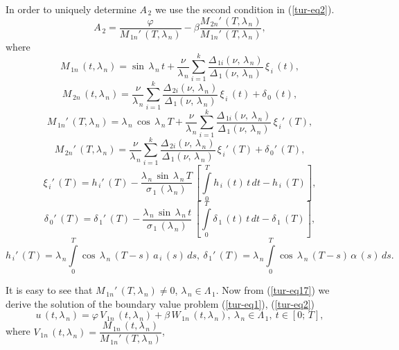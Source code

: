 ﻿\documentclass[
11pt,%
tightenlines,%
twoside,%
onecolumn,%
nofloats,%
nobibnotes,%
nofootinbib,%
superscriptaddress,%
noshowpacs,%
centertags]%
{revtex4}
\begin{document}
In order to uniquely determine $A_{\, 2}$ we use the second condition in (\ref{tur-eq2}). 
\[
A_{\, 2}=\dfrac{\varphi}{M_{\, 1 n}' \, (T , \lambda_{\, n})}-\beta \dfrac{M_{\, 2 n}' \, (T , \lambda_{\, n})}{M_{\, 1 n}' \, (T , \lambda_{\, n})} ,
\]
where
\[
M_{\, 1 n} \, (t , \lambda_{\, n})=\sin \, \lambda_{\, n} \, t+\frac{\nu}{\lambda_{\, n}} \sum \limits_{i=1}^{k}  \frac{\Delta_{\, 1 i }(\nu , \, \lambda_{\, n})}{\Delta_{\, 1} (\nu , \, \lambda_{\, n})} \, \xi_{\, i} \, (t) ,
\]
\[
M_{\, 2 n} \, (t , \lambda_{\, n})=\frac{\nu}{\lambda_{\, n}} \sum \limits_{i=1}^{k}  \frac{\Delta_{\, 2 i }(\nu , \, \lambda_{\, n})}{\Delta_{\, 1} (\nu , \, \lambda_{\, n})} \, \xi_{\, i} \, (t)+\delta_{\, 0} \, (t) ,
\]
\[
M_{\, 1 n}' \, (T , \lambda_{\, n})=\lambda_{\, n} \, \cos \, \lambda_{\, n} \, T+\frac{\nu}{\lambda_{\, n}} \sum \limits_{i=1}^{k}  \frac{\Delta_{\, 1 i }(\nu , \, \lambda_{\, n})}{\Delta_{\, 1} (\nu , \, \lambda_{\, n})} \, \xi_{\, i}' \, (T) ,
\]
\[
M_{\, 2 n}' \, (T , \lambda_{\, n})=\frac{\nu}{\lambda_{\, n}} \sum \limits_{i=1}^{k}  \frac{\Delta_{\, 2 i }(\nu , \, \lambda_{\, n})}{\Delta_{\, 1} (\nu , \, \lambda_{\, n})} \, \xi_{\, i}' \, (T)+\delta_{\, 0}' \, (T) ,
\]
\[
\xi_{\, i}' \, (T)=h_{\, i}' \, (T)-\frac{\lambda_{\, n} \, \sin \, \lambda_{\, n} \, T}{\sigma_{\, 1} \, (\lambda_{\, n})} \, \left[ \int \limits_{0}^T h_{\, i} \, (t) \, t \, d t-h_{\, i} \, (T) \right] ,
\]
\[
\delta_{\, 0}' \, (T)=\delta_{\, 1}' \, (T)-\frac{\lambda_{\, n} \, \sin \, \lambda_{\, n} \, t}{\sigma_{\, 1} \, (\lambda_{\, n})} \, \left[ \int \limits_{0}^T \delta_{\, 1} \, (t) \, t \, d t-\delta_{\, 1} \, (T) \right] ,
\]
\[
h_{\, i}' \, (T)= \lambda_{\, n} \int \limits_{0}^T \cos  \, \lambda_{\, n} \, (T-s) \, a_{\, i} \, (s) \, d s , \: 
 \delta_{\, 1}' \, (T)=\lambda_{\, n} \int \limits_{0}^T \cos  \, \lambda_{\, n} \, (T-s) \, \alpha \, (s) \, d s .
\]

It is easy to see that $M_{\, 1 n}' \, (T , \lambda_{\, n}) \ne 0$, $\lambda_{\, n} \in \Lambda_{\, 1}$.
Now from (\ref{tur-eq17}) we derive the solution of the boundary value problem (\ref{tur-eq1}), (\ref{tur-eq2})
\begin{equation} \label{tur-eq18}	
u \, (t , \lambda_{\, n})=\varphi \, V_{\, 1 n} \, (t , \lambda_{\, n})+\beta \, W_{\, 1 n} \, (t , \lambda_{\, n}) , \: \lambda_{\, n} \in \Lambda_{\, 1} , \: t \in [0 ; \, T] ,
\end{equation}
where $V_{\, 1 n} \, (t , \lambda_{\, n})=\dfrac{M_{\, 1 n} \, (t , \lambda_{\, n})}{M_{\, 1 n}' \, (T , \lambda_{\, n})}$, 
\end{document}
